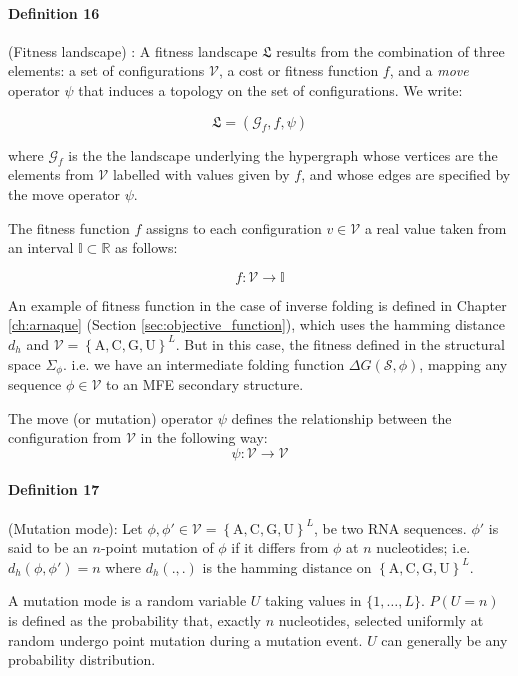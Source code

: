 \paragraph{\textbf{Definition 16}} (Fitness landscape) :  A fitness landscape $\mathfrak{L}$ results from the combination of three elements: a set of configurations $\mathcal{V}$, a cost or fitness function $f$, and a \textit{move} operator $\psi$ that induces a topology on the set of configurations. We write: 

\begin{equation}
	\mathfrak{L} = (\mathcal{G}_f, f, \psi)
\end{equation}

where $\mathcal{G}_f$  is the the landscape underlying the hypergraph whose vertices are the elements from $\mathcal{V}$ labelled with values given by $f$, and whose edges are specified by the move operator $\psi$.

The fitness function $f$ assigns to each configuration $v\in \mathcal{V}$ a real value taken from an interval $ \mathbb{I} \subset \mathbb{R}$ as follows: 

$$
f: \mathcal{V} \rightarrow \mathbb{I}
$$

An example of fitness function in the case of inverse folding is defined in Chapter \ref{ch:arnaque} (Section \ref{sec:objective_function}), which uses the hamming distance $d_h$ and $\mathcal{V}=\left\{ \text{A}, \text{C}, \text{G}, \text{U} \right\}^L$. But in this case, the fitness defined in the structural space $\Sigma_{\phi}$. i.e. we have an intermediate folding function $\Delta G (\mathcal{S}, \phi)$, mapping any sequence $\phi \in \mathcal{V}$ to an MFE secondary structure. 

The move (or mutation) operator $\psi$ defines the relationship between the configuration from  $\mathcal{V}$ in the following way: 
$$
\psi \colon \mathcal{V} \rightarrow \mathcal{V} 
$$
\paragraph{\textbf{Definition 17}} (Mutation mode): 
Let $\phi, \phi' \in \mathcal{V} = \left\{ \text{A}, \text{C}, \text{G}, \text{U} \right\}^L$, be  two RNA sequences. $\phi'$ is said to be an $n$-point mutation of $\phi$ if it differs from $\phi$ at $n$ nucleotides; i.e. $d_h(\phi, \phi')=n$ where $d_h(.,.)$ is the hamming distance on $\left\{ \text{A}, \text{C}, \text{G}, \text{U} \right\}^L$. 

A mutation mode is a random variable $U$ taking values in $\{1,\dots,L\}$. $P(U=n)$ is defined as the probability that, exactly $n$ nucleotides, selected uniformly at random undergo point mutation during a mutation event. $U$ can generally be any probability distribution.


